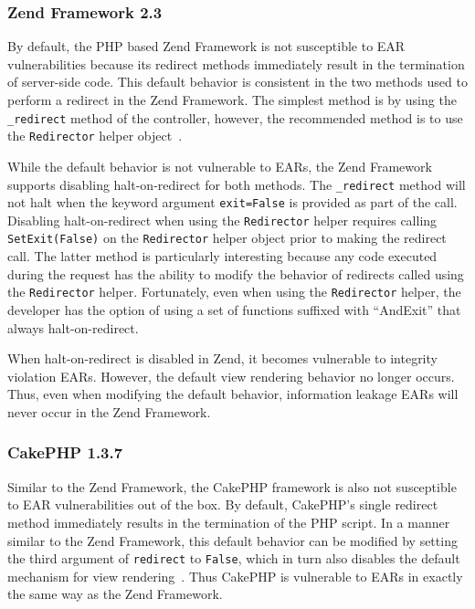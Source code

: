 \subsubsection{Zend Framework 2.3}
By default, the PHP based Zend Framework is not susceptible to EAR
vulnerabilities because its redirect methods immediately result in
the termination of server-side code. This default behavior is consistent in
the two methods used to perform a redirect in the Zend Framework. The simplest
method is by using the \texttt{\_redirect} method of the controller, however,
the recommended method is to use the \texttt{Redirector} helper
object~\cite{zend-redirector}.

While the default behavior is not vulnerable to EARs, the Zend Framework
supports disabling halt-on-redirect for both methods. The \texttt{\_redirect}
method will not halt when the keyword argument \texttt{exit=False} is provided
as part of the call. Disabling halt-on-redirect when using the
\texttt{Redirector} helper requires calling \texttt{SetExit(False)} on the
\texttt{Redirector} helper object prior to making the redirect call. The latter
method is particularly interesting because any code executed
during the request has the ability to modify the behavior of redirects called
using the \texttt{Redirector} helper. Fortunately, even when using the
\texttt{Redirector} helper, the developer has the option of using a set of
functions suffixed with ``AndExit'' that always halt-on-redirect.

When halt-on-redirect is disabled in Zend, it becomes vulnerable to
integrity violation EARs. However, the default view rendering behavior no
longer occurs. Thus, even when modifying the default behavior, information
leakage EARs will never occur in the Zend Framework.

\subsubsection{CakePHP 1.3.7}
Similar to the Zend Framework, the CakePHP framework is also not susceptible to
EAR vulnerabilities out of the box. By default, CakePHP's single redirect
method immediately results in the termination of the PHP script. In a manner
similar to the Zend Framework, this default behavior can be modified by setting
the third argument of \texttt{redirect} to \texttt{False}, which in turn also
disables the default mechanism for view rendering~\cite{cake-redirect}. Thus
CakePHP is vulnerable to EARs in exactly the same way as the Zend Framework.

